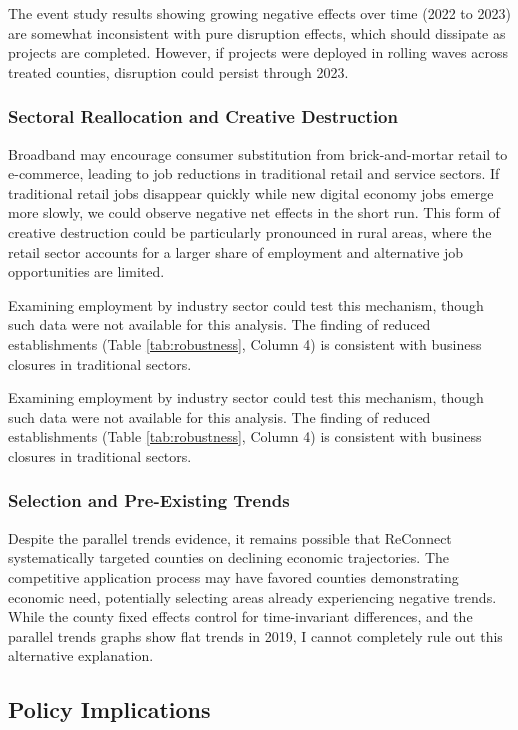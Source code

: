 \documentclass[12pt]{article}
\begin{document}
The event study results showing growing negative effects over time (2022 to 2023) are somewhat inconsistent with pure disruption effects, which should dissipate as projects are completed. However, if projects were deployed in rolling waves across treated counties, disruption could persist through 2023.


\subsubsection{Sectoral Reallocation and Creative Destruction}

Broadband may encourage consumer substitution from brick-and-mortar retail to e-commerce, leading to job reductions in traditional retail and service sectors. If traditional retail jobs disappear quickly while new digital economy jobs emerge more slowly, we could observe negative net effects in the short run. This form of creative destruction could be particularly pronounced in rural areas, where the retail sector accounts for a larger share of employment and alternative job opportunities are limited.

Examining employment by industry sector could test this mechanism, though such data were not available for this analysis. The finding of reduced establishments (Table \ref{tab:robustness}, Column 4) is consistent with business closures in traditional sectors.

Examining employment by industry sector could test this mechanism, though such data were not available for this analysis. The finding of reduced establishments (Table \ref{tab:robustness}, Column 4) is consistent with business closures in traditional sectors.

\subsubsection{Selection and Pre-Existing Trends}

Despite the parallel trends evidence, it remains possible that ReConnect systematically targeted counties on declining economic trajectories. The competitive application process may have favored counties demonstrating economic need, potentially selecting areas already experiencing negative trends. While the county fixed effects control for time-invariant differences, and the parallel trends graphs show flat trends in 2019, I cannot completely rule out this alternative explanation.

\subsection{Policy Implications}
\end{document}
